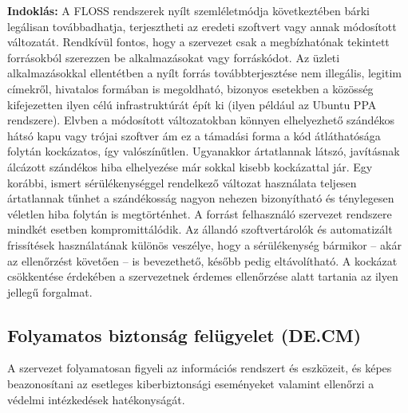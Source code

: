 \documentclass[12pt,magyar,a4paper,oneside]{scrreprt}
\begin{document}
\textbf{Indoklás: } A FLOSS rendszerek nyílt szemléletmódja
következtében bárki legálisan továbbadhatja, terjesztheti az eredeti
szoftvert vagy annak módosított változatát. Rendkívül fontos, hogy a
szervezet csak a megbízhatónak tekintett forrásokból szerezzen be
alkalmazásokat vagy forráskódot. Az üzleti alkalmazásokkal ellentétben a
nyílt forrás továbbterjesztése nem illegális, legitim címekről,
hivatalos formában is megoldható, bizonyos esetekben a közösség
kifejezetten ilyen célú infrastruktúrát épít ki (ilyen például az Ubuntu
PPA rendszere). Elvben a módosított változatokban könnyen elhelyezhető
szándékos hátsó kapu vagy trójai szoftver ám ez a támadási forma a kód
átláthatósága folytán kockázatos, így valószínűtlen. Ugyanakkor
ártatlannak látszó, javításnak álcázott szándékos hiba elhelyezése már
sokkal kisebb kockázattal jár. Egy korábbi, ismert sérülékenységgel
rendelkező változat használata teljesen ártatlannak tűnhet a
szándékosság nagyon nehezen bizonyítható és ténylegesen véletlen hiba
folytán is megtörténhet. A forrást felhasználó szervezet rendszere
mindkét esetben kompromittálódik. Az állandó szoftvertárolók és
automatizált frissítések használatának különös veszélye, hogy a
sérülékenység bármikor -- akár az ellenőrzést követően -- is
bevezethető, később pedig eltávolítható. A kockázat csökkentése
érdekében a szervezetnek érdemes ellenőrzése alatt tartania az ilyen
jellegű forgalmat.

\hypertarget{folyamatos-biztonsuxe1g-feluxfcgyelet-de.cm}{%
\subsection{Folyamatos biztonság felügyelet
(DE.CM)}\label{folyamatos-biztonsuxe1g-feluxfcgyelet-de.cm}}

A szervezet folyamatosan figyeli az információs rendszert és eszközeit,
és képes beazonosítani az esetleges kiberbiztonsági eseményeket valamint
ellenőrzi a védelmi intézkedések hatékonyságát.
\end{document}
